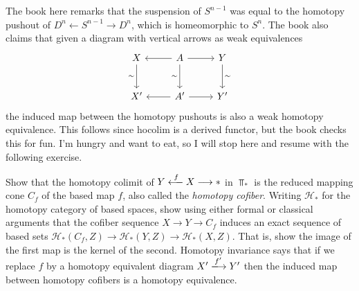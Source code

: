 The book here remarks that the suspension of $S^{n-1} $ was equal to the homotopy pushout of $D^n\leftarrow S^{n-1} \rightarrow D^n$, which is homeomorphic to $S^n$. The book also claims that given a diagram with vertical arrows as weak equivalences
\[\begin{tikzcd}[row sep = 2.5em, column sep = 2.5em]
X\ar[" \sim  "', d]  & A\ar[l] \ar[r] \ar[" \sim  "', d]  & Y\ar[" \sim  ", d]  \\
X' & A'\ar[l] \ar[r]  & Y'
\end{tikzcd}\]
the induced map between the homotopy pushouts is also a weak homotopy equivalence. This follows since hocolim is a derived functor, but the book checks this for fun. I'm hungry and want to eat, so I will stop here and resume with the following exercise.

\begin{exercise}
	Show that the homotopy colimit of $Y\xlongleftarrow{f}X\longrightarrow*$ in $\Top_*$ is the reduced mapping cone $C_f$ of the based map $f$, also called the \emph{homotopy cofiber}. Writing $\mathcal{H} _*$ for the homotopy category of based spaces, show using either formal or classical arguments that the cofiber sequence $X\to Y\to C_f$ induces an exact sequence of based sets $\mathcal{H} _*(C_f,Z)\to \mathcal{H} _*(Y,Z)\to \mathcal{H} _*(X,Z)$. That is, show the image of the first map is the kernel of the second. Homotopy invariance says that if we replace $f$ by a homotopy equivalent diagram $X'\xlongrightarrow{f'}Y'$ then the induced map between homotopy cofibers is a homotopy equivalence.
\end{exercise}
